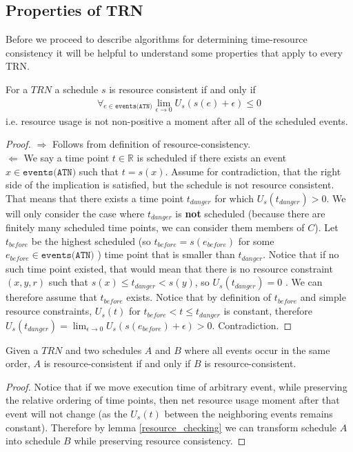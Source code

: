 \subsection{Properties of TRN}
Before we proceed to describe algorithms for determining time-resource consistency it will be helpful to understand some properties that apply to every TRN.
\begin{lemma}
\label{resource_checking}
For a $TRN$ a schedule $s$ is resource consistent if and only if
\begin{align}
\label{eq:resource_consistency}\forall_{e \in \texttt{events(ATN)}} \lim_{\epsilon \to 0} U_s(s(e) + \epsilon) \leq 0
\end{align}
i.e. resource usage is not non-positive a moment after all of the scheduled events.
\end{lemma}
\begin{proof}
$\Rightarrow$ Follows from definition of resource-consistency.\\
$\Leftarrow$ We say a time point $t \in \mathbb{R}$ is scheduled if there exists an event  $x \in \texttt{events(ATN)}$ such that $t = s(x)$. Assume for contradiction, that the right side of the implication is satisfied, but the schedule is not resource consistent. That means that there exists a time point $t_{danger}$ for which $U_s(t_{danger}) > 0 $. We will only consider the case where $t_{danger}$ is \textbf{not} scheduled (because there are finitely many scheduled time points, we can consider them members of $C$). Let $t_{before}$ be the highest scheduled (so $t_{before}=s(e_{before})$ for some $e_{before} \in \texttt{events(ATN)}$ ) time point that is smaller than $t_{danger}$. Notice that if no such time point existed, that would mean that there is no resource constraint $(x,y,r)$ such that $s(x) \leq t_{danger} < s(y)$, so $U_s(t_{danger})=0$ . We can therefore assume that $t_{before}$ exists. Notice that by definition of $t_{before}$ and simple resource constraints, $U_s(t)$ for $t_{before} < t \leq t_{danger}$ is constant, therefore $U_s(t_{danger}) = \lim_{\epsilon \to 0} U_s(s(e_{before}) + \epsilon) > 0$. Contradiction.

\end{proof}
\begin{corollary}
\label{cor:ordering}
Given a $TRN$ and two schedules $A$ and $B$ where all events occur in the same order, $A$ is resource-consistent if and only if $B$ is resource-consistent.
\end{corollary}
\begin{proof}
Notice that if we move execution time of arbitrary event, while preserving the relative ordering of time points, then net resource usage moment after that event will not change (as the $U_s(t)$ between the neighboring events remains constant). Therefore by lemma \ref{resource_checking} we can transform schedule $A$ into schedule $B$ while preserving resource consistency.
\end{proof}
